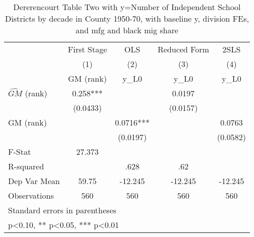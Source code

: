 \begin{table}[htbp]\centering
\def\sym#1{\ifmmode^{#1}\else\(^{#1}\)\fi}
\caption{Dererencourt Table Two with y=Number of Independent School Districts by decade in County 1950-70, with baseline y, division FEs, and mfg and black mig share}
\begin{tabular}{l*{4}{c}}
\toprule
                    & First Stage   &         OLS   &Reduced Form   &        2SLS   \\
                    &\multicolumn{1}{c}{(1)}&\multicolumn{1}{c}{(2)}&\multicolumn{1}{c}{(3)}&\multicolumn{1}{c}{(4)}\\
                    &\multicolumn{1}{c}{GM  (rank)}&\multicolumn{1}{c}{y\_L0}&\multicolumn{1}{c}{y\_L0}&\multicolumn{1}{c}{y\_L0}\\
\midrule
$\hat{GM}$ (rank)   &       0.258***&               &      0.0197   &               \\
                    &    (0.0433)   &               &    (0.0157)   &               \\
\addlinespace
GM  (rank)          &               &      0.0716***&               &      0.0763   \\
                    &               &    (0.0197)   &               &    (0.0582)   \\
\midrule
F-Stat              &      27.373   &               &               &               \\
R-squared           &               &        .628   &         .62   &               \\
Dep Var Mean        &       59.75   &     -12.245   &     -12.245   &     -12.245   \\
Observations        &         560   &         560   &         560   &         560   \\
\bottomrule
\multicolumn{5}{l}{\footnotesize Standard errors in parentheses}\\
\multicolumn{5}{l}{\footnotesize * p<0.10, ** p<0.05, *** p<0.01}\\
\end{tabular}
\end{table}

